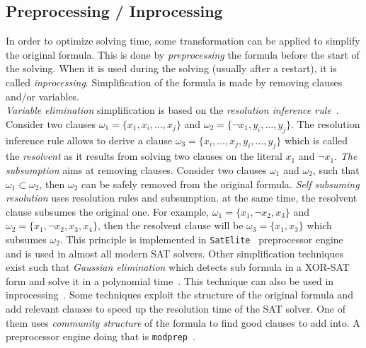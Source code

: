 \subsection{Preprocessing / Inprocessing}
In order to optimize solving time, some transformation can be applied to simplify the original formula.
This is done by \emph{preprocessing} the formula before the start of the solving.
When it is used during the solving (usually after a restart), it is called \emph{inprocessing}.
Simplification of the formula is made by removing clauses and/or variables.\\
\emph{Variable elimination} simplification is based on the \emph{resolution inference rule}~\cite{robinson1965machine}.
Consider two clauses $\omega_1 = \{x_1, x_i, ..., x_j \}$ and $\omega_2 = \{\neg x_1, y_i, ..., y_j\}$.
The resolution inference rule allows to derive a clause $\omega_3 = \{x_i, ..., x_j, y_i, ..., y_j\}$ which is called
the \emph{resolvent} as it results from solving two clauses on the literal $x_1$ and $\neg x_1$.
\emph{The subsumption} aims at removing  clauses. Consider two clauses $\omega_1$ and $\omega_2$, such that
$\omega_1 \subset  \omega_2$, then $\omega_2$ can be safely removed from the original formula.
\emph{Self subsuming resolution} uses resolution rules and subsumption. at the same time,
the resolvent clause subsumes the original one. For example, $\omega_1 = \{x_1, \neg x_2, x_3\}$ and $\omega_2 = \{x_1, \neg x_2, x_3, x_4\}$,
 then the resolvent clause will be $\omega_3 = \{x_1, x_3\}$ which subsumes $\omega_2$. This principle
is implemented in \texttt{SatElite}~\cite{een2005effective} preprocessor engine and is used in almost all modern SAT solvers.
Other simplification techniques exist such that \emph{Gaussian elimination} which detects sub formula in a XOR-SAT
form and solve it in a polynomial time~\cite{moore2011nature}. This technique can also be used in inprocessing~\cite{soos2010enhanced}. 
Some techniques exploit the structure of the original formula and add relevant clauses to speed up the resolution
time of the SAT solver. One of them uses \textit{community structure} of the formula to find good clauses to add into.
A preprocessor engine doing that is \texttt{modprep}~\cite{ansotegui2015using}.
